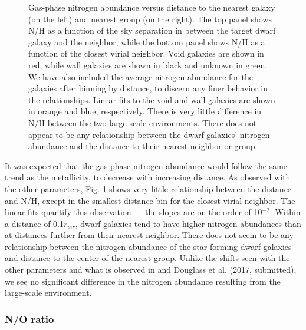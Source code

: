 \begin{figure}
    \caption[N/H versus distance to nearest neighbor and group]{Gas-phase 
    nitrogen abundance versus distance to the nearest galaxy (on the left) and 
    nearest group (on the right).  The top panel shows N/H as a function of the 
    sky separation in \hMpc between the target dwarf galaxy and the neighbor, 
    while the bottom panel shows N/H as a function of the closest virial 
    neighbor.  Void galaxies are shown in red, while wall galaxies are shown in 
    black and unknown in green.  We have also included the average nitrogen 
    abundance for the galaxies after binning by distance, to discern any finer 
    behavior in the relationships.  Linear fits to the void and wall galaxies 
    are shown in orange and blue, respectively.  There is very little difference 
    in N/H between the two large-scale environments.  There does not appear to 
    be any relationship between the dwarf galaxies' nitrogen abundance and the 
    distance to their nearest neighbor or group.}
    \label{fig:NH}
\end{figure}

It was expected that the gas-phase nitrogen abundance would follow the same 
trend as the metallicity, to decrease with increasing distance.  As observed 
with the other parameters, Fig. \ref{fig:NH} shows very little relationship 
between the distance and N/H, except in the smallest distance bin for the 
closest virial neighbor.  The linear fits quantify this observation --- the 
slopes are on the order of 10$^{-2}$.  Within a distance of 0.1$r_{vir}$, dwarf 
galaxies tend to have higher nitrogen abundances than at distances further from 
their nearest neighbor.  There does not seem to be any relationship between the 
nitrogen abundance of the star-forming dwarf galaxies and distance to the center 
of the nearest group.  Unlike the shifts seen with the other parameters and what 
is observed in \cite{Douglass17b} and Douglass et al. (2017, submitted), we see no 
significant difference in the nitrogen abundance resulting from the large-scale 
environment.


\subsubsection{N/O ratio}

